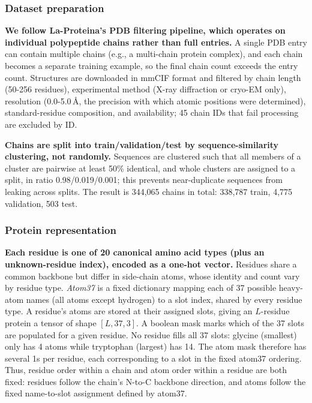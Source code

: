 \subsubsection{Dataset preparation}

\textbf{We follow La-Proteina's PDB filtering pipeline, which operates on individual
polypeptide chains rather than full entries.} A single PDB entry can contain multiple chains
(e.g., a multi-chain protein complex), and each chain becomes a separate training example, so
the final chain count exceeds the entry count. Structures are downloaded in mmCIF format and
filtered by chain length (50-256 residues), experimental method (X-ray diffraction or
cryo-EM only), resolution (0.0-5.0\,\AA, the precision with which atomic positions were
determined), standard-residue composition, and availability; 45 chain IDs that fail
processing are excluded by ID.

\textbf{Chains are split into train/validation/test by sequence-similarity clustering, not
randomly.} Sequences are clustered such that all members of a cluster are pairwise at least
50\% identical, and whole clusters are assigned to a split, in
ratio 0.98/0.019/0.001; this prevents near-duplicate sequences from leaking across splits.
The result is 344{,}065 chains in total: 338{,}787 train, 4{,}775 validation, 503 test.

\subsubsection{Protein representation}

\textbf{Each residue is one of 20 canonical amino acid types (plus an unknown-residue
index), encoded as a one-hot vector.} Residues share a common backbone but differ in
side-chain atoms, whose identity and count vary by residue type. \emph{Atom37} is a fixed
dictionary mapping each of 37 possible heavy-atom names (all atoms except hydrogen) to a
slot index, shared by every residue type. A residue's atoms are stored at their assigned
slots, giving an $L$-residue protein a tensor of shape $[L, 37, 3]$. A boolean mask marks
which of the 37 slots are populated for a given residue. No residue fills all 37
slots: glycine (smallest) only has 4 atoms while tryptophan (largest) has 14. The atom mask
therefore has several 1s per residue, each corresponding to a slot in the fixed atom37
ordering. Thus, residue order within a chain and atom order within a residue are both
fixed: residues follow the chain's N-to-C backbone direction, and atoms follow
the fixed name-to-slot assignment defined by atom37.

